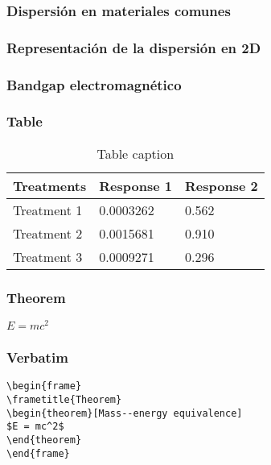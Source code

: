 \documentclass{beamer}
\begin{document}
		\begin{frame}
		\frametitle{Dispersión en materiales comunes}
		\end{frame}
	
		\begin{frame}
		\frametitle{Representación de la dispersión en 2D}
		\end{frame}
	
		\begin{frame}
		\frametitle{Bandgap electromagnético}
		\end{frame}

\begin{frame}
\frametitle{Table}
\begin{table}
\begin{tabular}{l l l}
\toprule
\textbf{Treatments} & \textbf{Response 1} & \textbf{Response 2}\\
\midrule
Treatment 1 & 0.0003262 & 0.562 \\
Treatment 2 & 0.0015681 & 0.910 \\
Treatment 3 & 0.0009271 & 0.296 \\
\bottomrule
\end{tabular}
\caption{Table caption}
\end{table}
\end{frame}


\begin{frame}
\frametitle{Theorem}
\begin{theorem}
$E = mc^2$
\end{theorem}
\end{frame}


\begin{frame}[fragile] %
\frametitle{Verbatim}
\begin{example}
\begin{verbatim}
\begin{frame}
\frametitle{Theorem}
\begin{theorem}[Mass--energy equivalence]
$E = mc^2$
\end{theorem}
\end{frame}\end{verbatim}
\end{example}
\end{frame}
\end{document}

